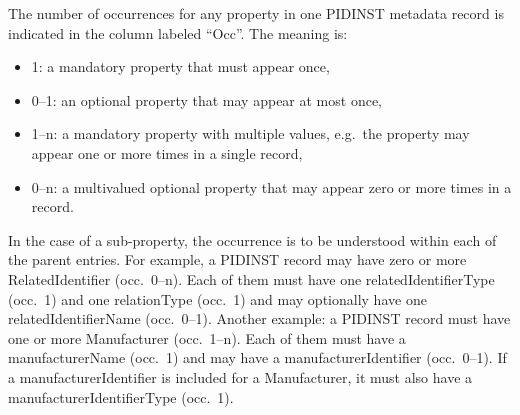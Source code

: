 \documentclass[titlepage=true,twoside=false,DIV=13]{scrartcl}
\begin{document}
The number of occurrences for any property in one PIDINST metadata
record is indicated in the column labeled ``Occ''.  The meaning is:
\begin{itemize}
\item 1: a mandatory property that must appear once,
\item 0--1: an optional property that may appear at most once,
\item 1--n: a mandatory property with multiple values, e.g.\ the
  property may appear one or more times in a single record,
\item 0--n: a multivalued optional property that may appear zero
  or more times in a record.
\end{itemize}
In the case of a sub-property, the occurrence is to be understood
within each of the parent entries.  For example, a PIDINST record may
have zero or more RelatedIdentifier (occ.\ 0--n).  Each of them must
have one relatedIdentifierType (occ.\ 1) and one relationType
(occ.\ 1) and may optionally have one relatedIdentifierName
(occ.\ 0--1).  Another example: a PIDINST record must have one or more
Manufacturer (occ.\ 1--n).  Each of them must have a manufacturerName
(occ.\ 1) and may have a manufacturerIdentifier (occ.\ 0--1).  If a
manufacturerIdentifier is included for a Manufacturer, it must also
have a manufacturerIdentifierType (occ.\ 1).

\newlength{\idcolw}\settowidth{\idcolw}{14.2.1}
\newlength{\propcolw}\settowidth{\propcolw}{instrumentTypeIdentifierType}
\newlength{\occcolw}
\newlength{\valcolw}\settowidth{\valcolw}{Controlled list of values:}
\setlength{\defcolw}{\textwidth}
\addtolength{\defcolw}{-\idcolw}
\addtolength{\defcolw}{-\propcolw}
\addtolength{\defcolw}{-\occcolw}
\addtolength{\defcolw}{-\valcolw}
\addtolength{\defcolw}{-10\tabcolsep}
\end{document}
